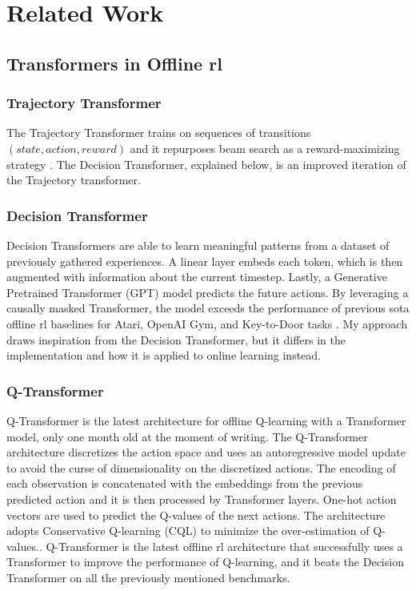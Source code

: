 \section{Related Work}

\subsection{Transformers in Offline \acrshort{rl}}

\subsubsection{Trajectory Transformer}
\sloppy The Trajectory Transformer trains on sequences of transitions $(state, action, reward)$ and it repurposes beam search as a reward-maximizing strategy \cite{trajectory_transformer}. The Decision Transformer, explained below, is an improved iteration of the Trajectory transformer.

\subsubsection{Decision Transformer}
Decision Transformers are able to learn meaningful patterns from a dataset of previously gathered experiences. A linear layer embeds each token, which is then augmented with information about the current timestep. Lastly, a Generative Pretrained Transformer (GPT) model predicts the future actions. By leveraging a causally masked Transformer, the model exceeds the performance of previous \acrfull{sota} offline \acrshort{rl} baselines for Atari, OpenAI Gym, and Key-to-Door tasks \cite{decision_transformer}. My approach draws inspiration from the Decision Transformer, but it differs in the implementation and how it is applied to online learning instead.

\subsubsection{Q-Transformer}
Q-Transformer is the latest architecture for offline Q-learning with a Transformer
model, only one month old at the moment of writing. The Q-Transformer architecture discretizes the action space and uses an autoregressive model update to avoid the curse of dimensionality on the discretized actions. The encoding of each observation is concatenated with the embeddings from the previous predicted action and it is then processed by Transformer layers. One-hot action vectors are used to predict the Q-values of the next actions. The architecture adopts Conservative Q-learning (CQL) to minimize the over-estimation of Q-values.\cite{q_transformer}. Q-Transformer is the latest offline \acrshort{rl} architecture that successfully uses a Transformer to improve the performance of Q-learning, and it beats the Decision Transformer on all the previously mentioned benchmarks.

